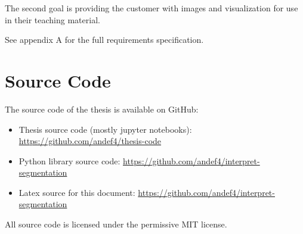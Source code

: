 The second goal is providing the customer with images and visualization for use in their teaching material.

See appendix A for the full requirements specification.

\section{Source Code}
The source code of the thesis is available on GitHub:
\begin{itemize}
    \item Thesis source code (mostly jupyter notebooks): \url{https://github.com/andef4/thesis-code}
    \item Python library source code: \url{https://github.com/andef4/interpret-segmentation}
    \item Latex source for this document: \url{https://github.com/andef4/interpret-segmentation}
\end{itemize}

All source code is licensed under the permissive MIT license.